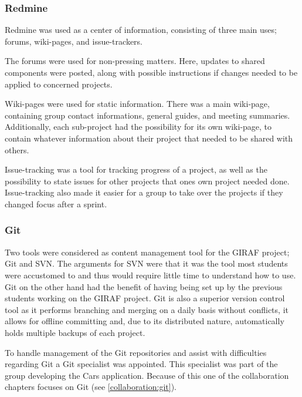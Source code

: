 \subsubsection{Redmine}
Redmine was used as a center of information, consisting of three main uses; forums, wiki-pages, and issue-trackers.

The forums were used for non-pressing matters.
Here, updates to shared components were posted, along with possible instructions if changes needed to be applied to concerned projects.

Wiki-pages were used for static information.
There was a main wiki-page, containing group contact informations, general guides, and meeting summaries.
Additionally, each sub-project had the possibility for its own wiki-page, to contain whatever information about their project that needed to be shared with others.

Issue-tracking was a tool for tracking progress of a project, as well as the possibility to state issues for other projects that ones own project needed done.
Issue-tracking also made it easier for a group to take over the projects if they changed focus after a sprint.

\subsubsection{Git}
Two tools were considered as content management tool for the GIRAF project; Git and SVN.
The arguments for SVN were that it was the tool most students were accustomed to and thus would require little time to understand how to use.
Git on the other hand had the benefit of having being set up by the previous students working on the GIRAF project.
Git is also a superior version control tool as it performs branching and merging on a daily basis without conflicts, it allows for offline committing and, due to its distributed nature, automatically holds multiple backups of each project.

To handle management of the Git repositories and assist with difficulties regarding Git a Git specialist was appointed.
This specialist was part of the group developing the Cars application.
Because of this one of the collaboration chapters focuses on Git (see \ref{collaboration:git}).

